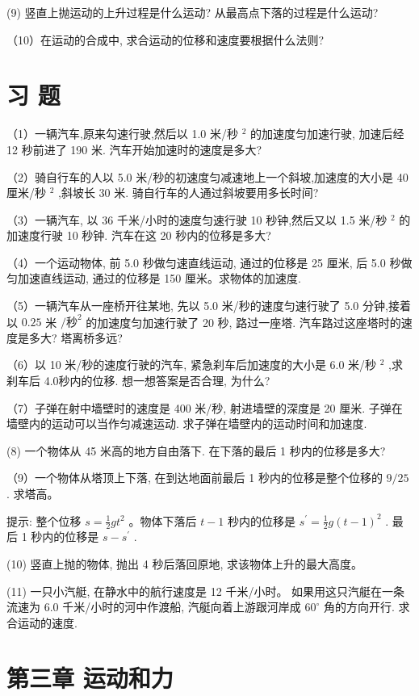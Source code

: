 \documentclass[10pt]{article}
\begin{document}
(9) 竖直上抛运动的上升过程是什么运动? 从最高点下落的过程是什么运动?

（10）在运动的合成中, 求合运动的位移和速度要根据什么法则?

\section*{习 题}

（1）一辆汽车,原来勾速行驶,然后以 1.0 米/秒 \({}^{2}\) 的加速度匀加速行驶, 加速后经 12 秒前进了 190 米. 汽车开始加速时的速度是多大?

（2）骑自行车的人以 5.0 米/秒的初速度匀减速地上一个斜坡,加速度的大小是 40 厘米/秒 \({}^{2}\) ,斜坡长 30 米. 骑自行车的人通过斜坡要用多长时间?

（3）一辆汽车, 以 36 千米/小时的速度匀速行驶 10 秒钟,然后又以 1.5 米/秒 \({}^{2}\) 的加速度行驶 10 秒钟. 汽车在这 20 秒内的位移是多大?

（4）一个运动物体, 前 5.0 秒做匀速直线运动, 通过的位移是 25 厘米, 后 5.0 秒做匀加速直线运动, 通过的位移是 150 厘米。求物体的加速度.

（5）一辆汽车从一座桥开往某地, 先以 5.0 米/秒的速度匀速行驶了 5.0 分钟,接着以 \({0.25}\) 米 \(/{秒}^{2}\) 的加速度匀加速行驶了 20 秒, 路过一座塔. 汽车路过这座塔时的速度是多大? 塔离桥多远?

（6）以 10 米/秒的速度行驶的汽车, 紧急刹车后加速度的大小是 6.0 米/秒 \({}^{2}\) ,求刹车后 4.0秒内的位移. 想一想答案是否合理, 为什么?

（7）子弹在射中墙壁时的速度是 400 米/秒, 射进墙壁的深度是 20 厘米. 子弹在墙壁内的运动可以当作匀减速运动. 求子弹在墙壁内的运动时间和加速度.

(8) 一个物体从 45 米高的地方自由落下. 在下落的最后 1 秒内的位移是多大?

（9）一个物体从塔顶上下落, 在到达地面前最后 1 秒内的位移是整个位移的 \(9/{25}\) . 求塔高。

提示: 整个位移 \(s = \frac{1}{2}g{t}^{2}\) 。物体下落后 \(t - 1\) 秒内的位移是 \({s}^{\prime } = \frac{1}{2}g{\left( t - 1\right) }^{2}\) . 最后 1 秒内的位移是 \(s - {s}^{\prime }\) .

(10) 竖直上抛的物体, 抛出 4 秒后落回原地, 求该物体上升的最大高度。

(11) 一只小汽艇, 在静水中的航行速度是 12 千米/小时。 如果用这只汽艇在一条流速为 6.0 千米/小时的河中作渡船, 汽艇向着上游跟河岸成 \({60}^{ \circ }\) 角的方向开行. 求合运动的速度.

\section*{第三章 运动和力}
\end{document}
